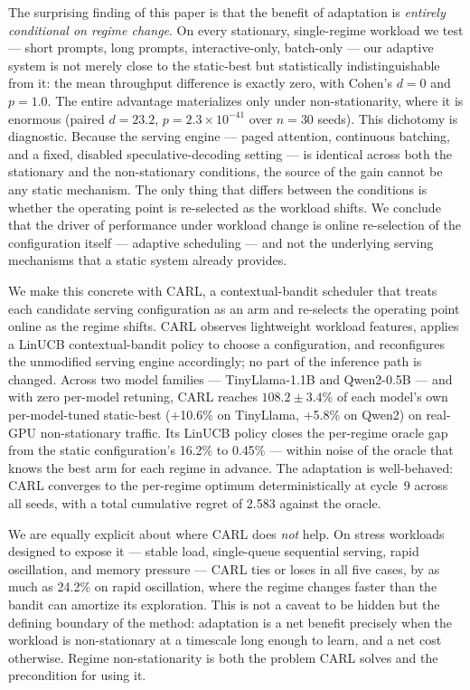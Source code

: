 The surprising finding of this paper is that the benefit of adaptation
is \emph{entirely conditional on regime change}. On every stationary,
single-regime workload we test --- short prompts, long prompts,
interactive-only, batch-only --- our adaptive system is not merely close
to the static-best but statistically indistinguishable from it: the mean
throughput difference is exactly zero, with Cohen's $d = 0$ and
$p = 1.0$. The entire advantage materializes only under
non-stationarity, where it is enormous (paired $d = 23.2$,
$p = 2.3\times10^{-41}$ over $n=30$ seeds). This dichotomy is
diagnostic. Because the serving engine --- paged attention, continuous
batching, and a fixed, disabled speculative-decoding setting --- is
identical across both the stationary and the non-stationary
conditions, the source of the gain cannot be any static mechanism. The
only thing that differs between the conditions is whether the operating
point is re-selected as the workload shifts. We conclude that the driver
of performance under workload change is online re-selection of the
configuration itself --- adaptive scheduling --- and not the underlying
serving mechanisms that a static system already provides.

We make this concrete with CARL, a contextual-bandit scheduler that
treats each candidate serving configuration as an arm and re-selects the
operating point online as the regime shifts. CARL observes lightweight
workload features, applies a LinUCB contextual-bandit policy to choose a
configuration, and reconfigures the unmodified serving engine
accordingly; no part of the inference path is changed. Across two model
families --- TinyLlama-1.1B and Qwen2-0.5B --- and with zero per-model
retuning, CARL reaches $108.2 \pm 3.4\%$ of each model's own
per-model-tuned static-best (+10.6\% on TinyLlama, +5.8\% on Qwen2) on
real-GPU non-stationary traffic. Its LinUCB policy closes the per-regime
oracle gap from the static configuration's 16.2\% to 0.45\% --- within
noise of the oracle that knows the best arm for each regime in advance.
The adaptation is well-behaved: CARL converges to the per-regime optimum
deterministically at cycle~9 across all seeds, with a total cumulative
regret of 2.583 against the oracle.

We are equally explicit about where CARL does \emph{not} help. On stress
workloads designed to expose it --- stable load, single-queue
sequential serving, rapid oscillation, and memory pressure --- CARL ties
or loses in all five cases, by as much as 24.2\% on rapid oscillation,
where the regime changes faster than the bandit can amortize its
exploration. This is not a caveat to be hidden but the defining boundary
of the method: adaptation is a net benefit precisely when the workload
is non-stationary at a timescale long enough to learn, and a net cost
otherwise. Regime non-stationarity is both the problem CARL solves and
the precondition for using it.

